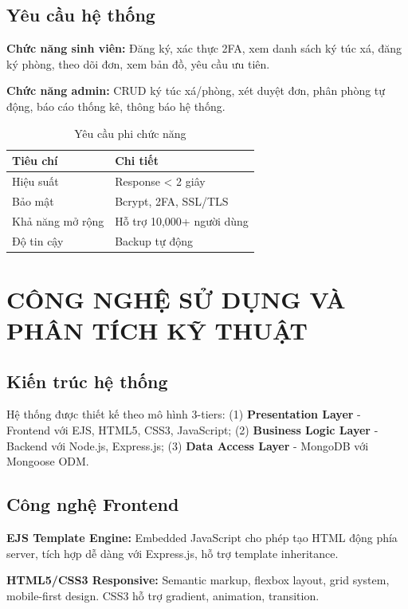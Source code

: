 \documentclass[12pt,a4paper]{article}
\begin{document}
\subsection{Yêu cầu hệ thống}

\textbf{Chức năng sinh viên:} Đăng ký, xác thực 2FA, xem danh sách ký túc xá, đăng ký phòng, theo dõi đơn, xem bản đồ, yêu cầu ưu tiên.

\textbf{Chức năng admin:} CRUD ký túc xá/phòng, xét duyệt đơn, phân phòng tự động, báo cáo thống kê, thông báo hệ thống.

\begin{table}[h]
\centering
\fontsize{10pt}{11pt}\selectfont
\caption{Yêu cầu phi chức năng}
\begin{tabular}{|l|l|}
\hline
\textbf{Tiêu chí} & \textbf{Chi tiết} \\
\hline
Hiệu suất & Response < 2 giây \\
Bảo mật & Bcrypt, 2FA, SSL/TLS \\
Khả năng mở rộng & Hỗ trợ 10,000+ người dùng \\
Độ tin cậy & Backup tự động \\
\hline
\end{tabular}
\end{table}

\newpage
\section{CÔNG NGHỆ SỬ DỤNG VÀ PHÂN TÍCH KỸ THUẬT}

\subsection{Kiến trúc hệ thống}

Hệ thống được thiết kế theo mô hình 3-tiers: (1) \textbf{Presentation Layer} - Frontend với EJS, HTML5, CSS3, JavaScript; (2) \textbf{Business Logic Layer} - Backend với Node.js, Express.js; (3) \textbf{Data Access Layer} - MongoDB với Mongoose ODM.

\subsection{Công nghệ Frontend}

\textbf{EJS Template Engine:} Embedded JavaScript cho phép tạo HTML động phía server, tích hợp dễ dàng với Express.js, hỗ trợ template inheritance.

\textbf{HTML5/CSS3 Responsive:} Semantic markup, flexbox layout, grid system, mobile-first design. CSS3 hỗ trợ gradient, animation, transition.
\end{document}
